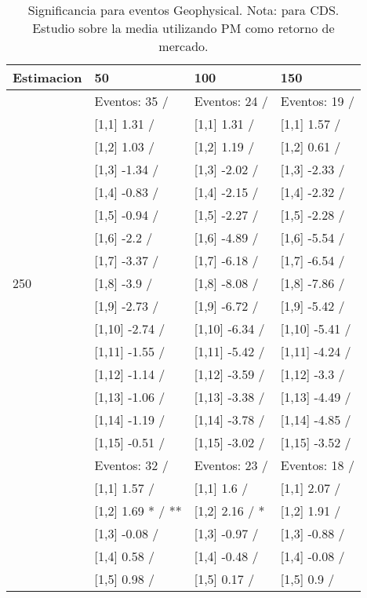 \begin{table}

\caption{Significancia para eventos Geophysical. Nota: para CDS. Estudio sobre la media utilizando PM como retorno de mercado.}
\centering
\begin{tabular}[t]{llll}
\toprule
Estimacion & 50 & 100 & 150\\
\midrule
 & Eventos:  35 / & Eventos:  24 / & Eventos:  19 /\\
 & {}[1,1] 1.31  / & {}[1,1] 1.31  / & {}[1,1] 1.57  /\\
 & {}[1,2] 1.03  / & {}[1,2] 1.19  / & {}[1,2] 0.61  /\\
 & {}[1,3] -1.34  / & {}[1,3] -2.02  / & {}[1,3] -2.33  /\\
 & {}[1,4] -0.83  / & {}[1,4] -2.15  / & {}[1,4] -2.32  /\\
\addlinespace
 & {}[1,5] -0.94  / & {}[1,5] -2.27  / & {}[1,5] -2.28  /\\
 & {}[1,6] -2.2  / & {}[1,6] -4.89  / & {}[1,6] -5.54  /\\
 & {}[1,7] -3.37  / & {}[1,7] -6.18  / & {}[1,7] -6.54  /\\
250 & {}[1,8] -3.9  / & {}[1,8] -8.08  / & {}[1,8] -7.86  /\\
 & {}[1,9] -2.73  / & {}[1,9] -6.72  / & {}[1,9] -5.42  /\\
\addlinespace
 & {}[1,10] -2.74  / & {}[1,10] -6.34  / & {}[1,10] -5.41  /\\
 & {}[1,11] -1.55  / & {}[1,11] -5.42  / & {}[1,11] -4.24  /\\
 & {}[1,12] -1.14  / & {}[1,12] -3.59  / & {}[1,12] -3.3  /\\
 & {}[1,13] -1.06  / & {}[1,13] -3.38  / & {}[1,13] -4.49  /\\
 & {}[1,14] -1.19  / & {}[1,14] -3.78  / & {}[1,14] -4.85  /\\
\addlinespace
 & {}[1,15] -0.51  / & {}[1,15] -3.02  / & {}[1,15] -3.52  /\\
 & Eventos:  32 / & Eventos:  23 / & Eventos:  18 /\\
 & {}[1,1] 1.57  / & {}[1,1] 1.6  / & {}[1,1] 2.07  /\\
 & {}[1,2] 1.69 * / ** & {}[1,2] 2.16  / * & {}[1,2] 1.91  /\\
 & {}[1,3] -0.08  / & {}[1,3] -0.97  / & {}[1,3] -0.88  /\\
\addlinespace
 & {}[1,4] 0.58  / & {}[1,4] -0.48  / & {}[1,4] -0.08  /\\
 & {}[1,5] 0.98  / & {}[1,5] 0.17  / & {}[1,5] 0.9  /\\

\end{tabular}
\end{table}

